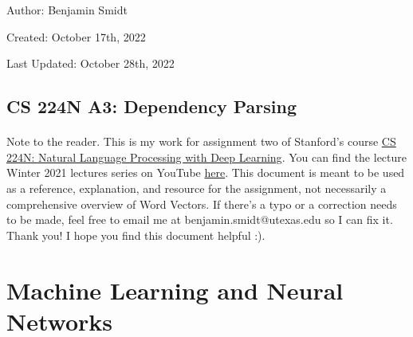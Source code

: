 \documentclass[12pt]{article}
\begin{document}
\noindent Author: Benjamin Smidt

\noindent Created: October 17th, 2022

\noindent Last Updated: October 28th, 2022
\begin{center}
\section*{CS 224N A3: Dependency Parsing}
\end{center}

\paragraph{} Note to the reader. This is my work for assignment two of Stanford's course
\href{https://web.stanford.edu/class/cs224n/}{CS 224N: Natural Language Processing with Deep Learning}. 
You can find the lecture Winter 2021 lectures series on YouTube 
\href{https://www.youtube.com/playlist?list=PLoROMvodv4rOSH4v6133s9LFPRHjEmbmJ}{here}.
This document is meant to be used as a reference, explanation, and resource for the assignment, 
not necessarily a comprehensive overview of Word Vectors. If there's a typo or a correction 
needs to be made, feel free to email me at benjamin.smidt@utexas.edu so I can fix it. 
Thank you! I hope you find this document helpful :). 

\tableofcontents{}

\newpage

\section{Machine Learning and Neural Networks}
\end{document}
